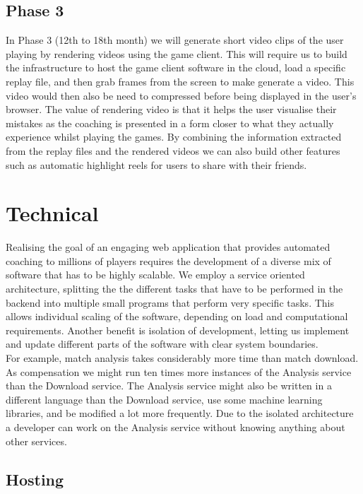 \documentclass[12pt]{article} %
\let\oldsection\section
\renewcommand\section{\clearpage\oldsection}
\begin{document}
\subsection{Phase 3}

In Phase 3 (12th to 18th month) we will generate short video clips of the user playing by rendering videos using the game client. This will require us to build the infrastructure to host the game client software in the cloud, load a specific replay file, and then grab frames from the screen to make generate a video. This video would then also be need to compressed before being displayed in the user's browser. The value of rendering video is that it helps the user visualise their mistakes as the coaching is presented in a form closer to what they actually experience whilst playing the games. By combining the information extracted from the replay files and the rendered videos we can also build other features such as automatic highlight reels for users to share with their friends.

\section{Technical}

Realising the goal of an engaging web application that provides automated coaching to millions of players requires the development of a diverse mix of software that has to be highly scalable. We employ a service oriented architecture, splitting the the different tasks that have to be performed in the backend into multiple small programs that perform very specific tasks. This allows individual scaling of the software, depending on load and computational requirements. Another benefit is isolation of development, letting us implement and update different parts of the software with clear system boundaries.\\

For example, match analysis takes considerably more time than match download. As compensation we might run ten times more instances of the Analysis service than the Download service. The Analysis service might also be written in a different language than the Download service, use some machine learning libraries, and be modified a lot more frequently. Due to the isolated architecture a developer can work on the Analysis service without knowing anything about other services.

\subsection{Hosting}
\end{document}
